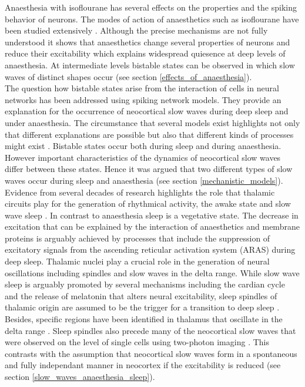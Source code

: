 Anaesthesia with isoflourane has several effects on the properties and the spiking behavior of neurons. The modes of action of anaesthetics such as isoflourane have been studied extensively \parencite{qazzaz2017modulation, moghadam2019comparative, eger1981isoflurane, jenkins1999effects}. Although the precise mechanisms are not fully understood it shows that anaesthetics change several properties of neurons and reduce their excitability which explains widespread quiesence at deep levels of anaesthesia. At intermediate levels bistable states can be observed in which slow waves of distinct shapes occur (see section \ref{effects_of_anaesthesia}).\\
The question how bistable states arise from the interaction of cells in neural networks has been addressed using spiking network models. They provide an explanation for the occurrence of neocortical slow waves during deep sleep and under anaesthesia. The circumstance that several models exist highlights not only that different explanations are possible but also that different kinds of processes might exist \parencite{nghiem2018two}. Bistable states occur both during sleep and during anaesthesia. However important characteristics of the dynamics of neocortical slow waves differ between these states. Hence it was argued that two different types of slow waves occur during sleep and anaesthesia (see section \ref{mechanistic_models}). \\
Evidence from several decades of research highlights the role that thalamic circuits play for the generation of rhythmical activity, the awake state and slow wave sleep \parencite{brown2012control}. In contrast to anaesthesia sleep is a vegetative state. The decrease in excitation that can be explained by the interaction of anaesthetics and membrane proteins is arguably achieved by processes that include the suppression of excitatory signals from the ascending reticular activation system  (ARAS) during deep sleep. Thalamic nuclei play a crucial role in the generation of neural oscillations including spindles and slow waves in the delta range. While slow wave sleep is arguably promoted by several mechanisms including the cardian cycle and the release of melatonin that alters neural excitability, sleep spindles of thalamic origin are assumed to be the trigger for a transition to deep sleep \parencite[p. 347]{montagna2005fatal}. Besides, specific regions have been identified in thalamus that oscillate in the delta range \parencite{steriade1984thalamus}. Sleep spindles also precede many of the neocortical slow waves that were observed on the level of single cells using two-photon imaging \parencite{niethard2018cortical}. This contrasts with the assumption that neocortical slow waves form in a spontaneous and fully independant manner in neocortex if the excitability is reduced (see section \ref{slow_waves_anaesthesia_sleep}).\\
